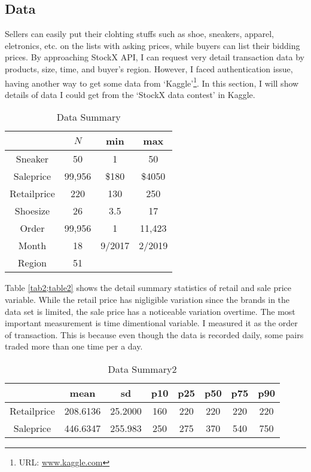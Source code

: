 \documentclass[a4paper]{article}
\theoremstyle{definition}
\theoremstyle{definition}
\theoremstyle{remark}
\begin{document}
\begin{large}
\section{Data}


Sellers can easily put their clohting stuffs such as shoe, sneakers, apparel, eletronics, etc. on the lists with asking prices, while buyers can list their bidding prices. By approaching StockX API, I can request very detail transaction data by products, size, time, and buyer's region. However, I faced authentication issue, having another way to get some data from `Kaggle'\footnote{URL: \url{www.kaggle.com}}. In this section, I will show details of data I could get from the `StockX data contest' in Kaggle.

\begin{table}[H]
	\centering
	\caption{Data Summary}
	\begin{tabular}{c|ccc}
		\hline\hline
		& $ N $ & min & max \\\hline
		Sneaker & 50  & 1  & 50   \\
		Saleprice & 99,956 & \$180 & \$4050 \\
		Retailprice & 220 & 130 & 250 \\
		Shoesize & 26 & 3.5 & 17  \\
		Order & 99,956 &  1 & 11,423 \\
		Month & 18 & 9/2017 & 2/2019 \\
		Region & 51 & & \\
		\hline\hline
	\end{tabular}
	\label{tab;table1}
\end{table}



Table \ref{tab2;table2} shows the detail summary statistics of retail and sale price variable. While the retail price has nigligible variation since the brands in the data set is limited, the sale price has a noticeable variation overtime. The most important measurement is time dimentional variable. I measured it as the order of transaction. This is because even though the data is recorded daily, some pairs traded more than one time per a day. 

\begin{table}[h]
	\centering
	\caption{Data Summary2}
	\begin{tabular}{c|ccccccc}
		\hline\hline
		& mean & sd & p10 & p25 & p50 & p75 & p90 \\\hline
		Retailprice & 208.6136  & 25.2000  & 160 & 220 & 220 & 220 & 220 \\
		Saleprice & 446.6347  & 255.983  & 250 & 275 & 370 & 540 & 750   \\
		\hline\hline
	\end{tabular}
	\label{tab;table2}
\end{table}


\end{large}
\end{document}
